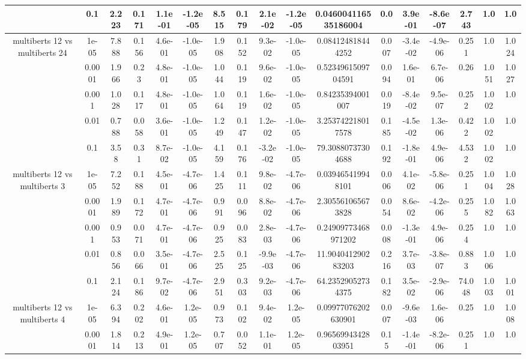 \begin{tabular}{|c|c|c|c|c|c|c|c|c|c|c|c|c|c|c|c|c|}
 & 0.1 & 2.223 & 0.171 & 1.1e-01 & -1.2e-05 & 8.515 & 0.179 & 2.1e-02 & -1.2e-05 & 0.046004116535186004 & 0.0 & 3.9e-01 & -8.6e-07 & 2.743 & 1.0 & 1.0 \\
\hline
\multirow{5}{*}{multiberts 12 vs multiberts 24} & 1e-05 & 7.888 & 0.156 & 4.6e-01 & -1.0e-05 & 1.908 & 0.152 & 9.3e-02 & -1.0e-05 & 0.084124818444252 & 0.007 & -3.4e-02 & -4.9e-06 & 0.251 & 1.0 & 1.024 \\
 & 0.0001 & 1.966 & 0.23 & 4.8e-01 & -1.0e-05 & 1.044 & 0.119 & 9.6e-02 & -1.0e-05 & 0.5234961509704591 & 0.094 & 1.6e-01 & 6.7e-06 & 0.26 & 1.051 & 1.027 \\
 & 0.001 & 1.028 & 0.117 & 4.8e-01 & -1.0e-05 & 1.064 & 0.119 & 1.6e-02 & -1.0e-05 & 0.84235394001007 & 0.019 & -8.4e-02 & 9.5e-07 & 0.252 & 1.002 & 1.0 \\
 & 0.01 & 0.788 & 0.058 & 3.6e-01 & -1.0e-05 & 1.249 & 0.147 & 1.2e-02 & -1.0e-05 & 3.253742218017578 & 0.185 & -4.5e-02 & 1.3e-06 & 0.422 & 1.002 & 1.0 \\
 & 0.1 & 3.58 & 0.31 & 8.7e-02 & -1.0e-05 & 4.159 & 0.176 & -3.2e-02 & -1.0e-05 & 79.30880737304688 & 0.192 & -1.8e-01 & 4.9e-06 & 4.532 & 1.002 & 1.0 \\
\hline
\multirow{5}{*}{multiberts 12 vs multiberts 3} & 1e-05 & 7.252 & 0.188 & 4.5e-01 & -4.7e-06 & 1.425 & 0.111 & 9.8e-02 & -4.7e-06 & 0.039465419948101 & 0.006 & 4.1e-02 & -5.8e-06 & 0.251 & 1.004 & 1.028 \\
 & 0.0001 & 1.989 & 0.172 & 4.7e-01 & -4.7e-06 & 0.991 & 0.096 & 8.8e-02 & -4.7e-06 & 2.305561065673828 & 0.054 & 8.6e-02 & -4.2e-06 & 0.255 & 1.082 & 1.063 \\
 & 0.001 & 0.953 & 0.071 & 4.7e-01 & -4.7e-06 & 0.925 & 0.083 & 2.8e-03 & -4.7e-06 & 0.24909773468971202 & 0.008 & -1.3e-01 & 4.9e-06 & 0.254 & 1.0 & 1.0 \\
 & 0.01 & 0.856 & 0.066 & 3.5e-01 & -4.7e-06 & 2.525 & 0.125 & -9.9e-03 & -4.7e-06 & 11.904041290283203 & 0.216 & 3.7e-03 & -3.8e-07 & 0.883 & 1.006 & 1.0 \\
 & 0.1 & 2.124 & 0.186 & 9.7e-02 & -4.7e-06 & 2.951 & 0.303 & 9.2e-03 & -4.7e-06 & 64.23529052734375 & 0.182 & 3.5e-02 & -2.9e-06 & 74.048 & 1.003 & 1.001 \\
\hline
\multirow{5}{*}{multiberts 12 vs multiberts 4} & 1e-05 & 6.394 & 0.202 & 4.6e-01 & 1.2e-05 & 0.973 & 0.102 & 9.4e-02 & 1.2e-05 & 0.09977076202630901 & 0.007 & -9.6e-03 & 1.6e-06 & 0.25 & 1.0 & 1.008 \\
 & 0.0001 & 1.814 & 0.213 & 4.9e-01 & 1.2e-05 & 0.707 & 0.052 & 1.1e-01 & 1.2e-05 & 0.9656994342803951 & 0.15 & -1.4e-01 & -8.2e-06 & 0.251 & 1.0 & 1.0 \\

\end{tabular}
